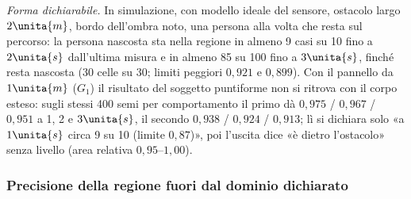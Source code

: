 \emph{Forma dichiarabile.} In simulazione, con modello ideale del sensore, ostacolo largo $2\unita{m}$, bordo dell'ombra noto, una persona alla volta che resta sul percorso: la persona nascosta sta nella regione in almeno 9 casi su 10 fino a $2\unita{s}$ dall'ultima misura e in almeno 85 su 100 fino a $3\unita{s}$, finché resta nascosta (30 celle su 30; limiti peggiori $0{,}921$ e $0{,}899$). Con il pannello da $1\unita{m}$ ($G_1$) il risultato del soggetto puntiforme non si ritrova con il corpo esteso: sugli stessi 400 semi per comportamento il primo dà $0{,}975$ / $0{,}967$ / $0{,}951$ a 1, 2 e $3\unita{s}$, il secondo $0{,}938$ / $0{,}924$ / $0{,}913$; lì si dichiara solo «a $1\unita{s}$ circa 9 su 10 (limite $0{,}87$)», poi l'uscita dice «è dietro l'ostacolo» senza livello (area relativa $0{,}95$–$1{,}00$).

\subsubsection*{Precisione della regione fuori dal dominio dichiarato}

